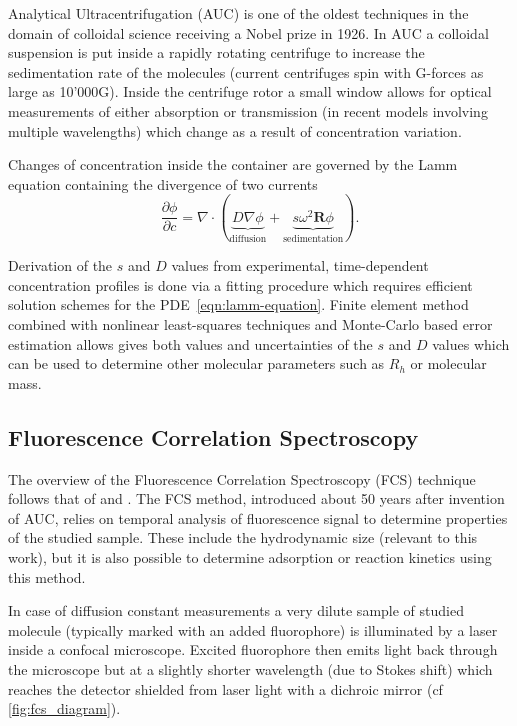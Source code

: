 \documentclass{doctoral}
\newcommand{\pd}{\partial}
\begin{document}
Analytical Ultracentrifugation (AUC) is one of the oldest techniques in the domain of colloidal science receiving a Nobel prize in 1926.
In AUC a colloidal suspension is put inside a rapidly rotating centrifuge to increase the sedimentation rate of the molecules (current centrifuges spin with G-forces as large as 10'000G).
Inside the centrifuge rotor a small window allows for optical measurements of either absorption or transmission (in recent models involving multiple wavelengths) which change as a result of concentration variation.

Changes of concentration inside the container are governed by the Lamm equation containing the divergence of two currents
\begin{equation}
    \frac{\pd \phi}{\pd c} = \nabla \cdot \left( \underbrace{D \nabla \phi}_\text{diffusion} + \underbrace{s \omega^2 \mathbf{R} \phi}_\text{sedimentation} \right).
    \label{eqn:lamm-equation}
\end{equation}

Derivation of the $s$ and $D$ values from experimental, time-dependent concentration profiles is done via a fitting procedure which requires efficient solution schemes for the PDE~\eqref{eqn:lamm-equation}\cite{Demeler_2016,Cao_2005}.
Finite element method combined with nonlinear least-squares techniques and Monte-Carlo based error estimation allows gives both values and uncertainties of the $s$ and $D$ values which can be used to determine other molecular parameters such as $R_h$ or molecular mass.

\subsection{Fluorescence Correlation Spectroscopy}
\label{sec:FCS}

The overview of the Fluorescence Correlation Spectroscopy (FCS) technique follows that of \textcite{Tompson_2002} and \textcite{Gregor_2008}.
The FCS method, introduced about 50 years after invention of AUC, relies on temporal analysis of fluorescence signal to determine properties of the studied sample.
These include the hydrodynamic size (relevant to this work), but it is also possible to determine adsorption or reaction kinetics using this method.

In case of diffusion constant measurements a very dilute sample of studied molecule (typically marked with an added fluorophore) is illuminated by a laser inside a confocal microscope.
Excited fluorophore then emits light back through the microscope but at a slightly shorter wavelength (due to Stokes shift) which reaches the detector shielded from laser light with a dichroic mirror (cf \ref{fig:fcs_diagram}).
\end{document}
